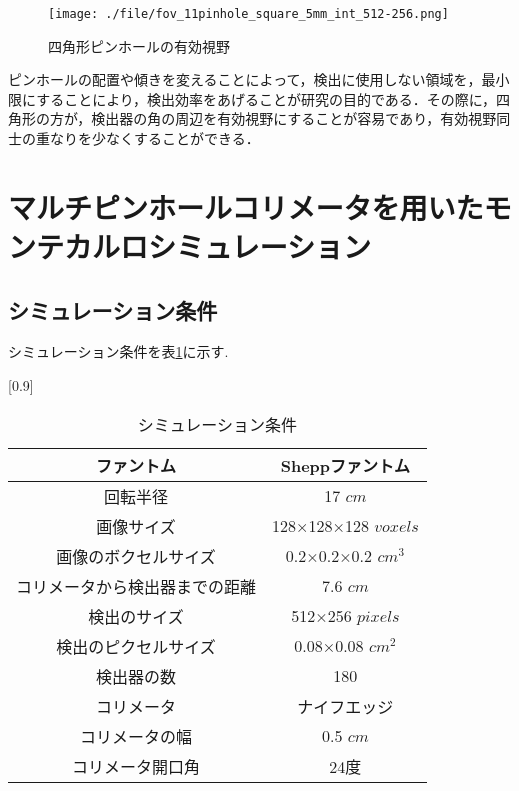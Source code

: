 \documentclass[dvipdfmx,autodetect-engine,twocolumn,10pt]{jsarticle}%
\begin{document}
\begin{figure}[htbp]
  \begin{center}
    \texttt{[image: ./file/fov\_11pinhole\_square\_5mm\_int\_512-256.png]}\\
    \caption{四角形ピンホールの有効視野}
    \label{square_fov}
  \end{center}
\end{figure}

ピンホールの配置や傾きを変えることによって，検出に使用しない領域を，最小限にすることにより，検出効率をあげることが研究の目的である．その際に，四角形の方が，検出器の角の周辺を有効視野にすることが容易であり，有効視野同士の重なりを少なくすることができる．


\section{マルチピンホールコリメータを用いたモンテカルロシミュレーション}


\subsection{シミュレーション条件}
シミュレーション条件を表\ref{simu_2d}に示す.

\begin{table}[htbp]
  \begin{center}
    \caption{シミュレーション条件}
    \label{simu_2d}
    \small
    \scalebox{0.82}[0.9]
    {
      \begin{tabular}{|c|c|} \hline
        ファントム & Sheppファントム \\ \hline
        回転半径 & 17 $cm$ \\ \hline
        画像サイズ & 128×128×128 $voxels$ \\ \hline
        画像のボクセルサイズ & 0.2×0.2×0.2 $cm^3$ \\ \hline
        コリメータから検出器までの距離 & 7.6 $cm$ \\ \hline
        検出のサイズ & 512×256 $pixels$ \\ \hline
        検出のピクセルサイズ & 0.08×0.08 $cm^2$ \\ \hline
        検出器の数 & 180 \\ \hline
        コリメータ & ナイフエッジ \\ \hline
        コリメータの幅 & 0.5 $cm$ \\ \hline
        コリメータ開口角 & 24度 \\ \hline
      \end{tabular}
    }
  \end{center}
\end{table}
\end{document}

